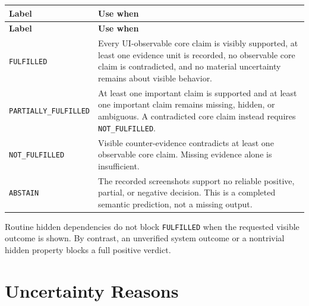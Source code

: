 \begin{longtable}{@{}>{\raggedright\arraybackslash}p{}>{\raggedright\arraybackslash}p{}@{}}
  \toprule
  \textbf{Label} & \textbf{Use when} \\
  \midrule
  \endfirsthead
  \toprule
  \textbf{Label} & \textbf{Use when} \\
  \midrule
  \endhead
  \texttt{FULFILLED} & Every UI-observable core claim is visibly supported, at least one evidence unit is recorded, no observable core claim is contradicted, and no material uncertainty remains about visible behavior. \\
  \texttt{PARTIALLY\_\allowbreak FULFILLED} & At least one important claim is supported and at least one important claim remains missing, hidden, or ambiguous. A contradicted core claim instead requires \texttt{NOT\_FULFILLED}. \\
  \texttt{NOT\_FULFILLED} & Visible counter-evidence contradicts at least one observable core claim. Missing evidence alone is insufficient. \\
  \texttt{ABSTAIN} & The recorded screenshots support no reliable positive, partial, or negative decision. This is a completed semantic prediction, not a missing output. \\
  \bottomrule
\end{longtable}

Routine hidden dependencies do not block \texttt{FULFILLED} when the requested
visible outcome is shown. By contrast, an unverified system outcome or a
nontrivial hidden property blocks a full positive verdict.

\section{Uncertainty Reasons}

\vspace{0.5\baselineskip}

